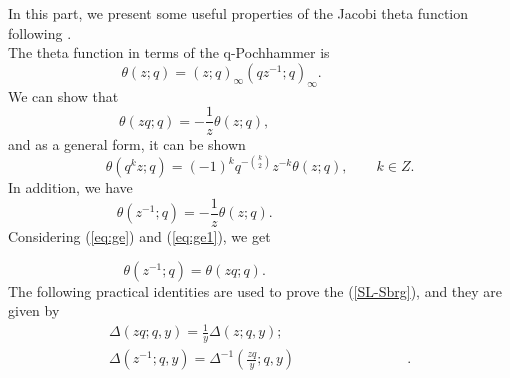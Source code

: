\documentclass[a4paper,11pt]{article}%
\numberwithin{equation}{section}
\begin{document}
In this part, we present some useful properties of the Jacobi theta function following \cite{Rosengren:2016qtr, Mod-Analyses}. \\
The theta function in terms of the q-Pochhammer is
\begin{equation}\label{theta;poch}
    \theta(z;q)=(z;q)_{\infty}(qz^{-1};q)_{\infty}.\qquad\qquad\,\,\,\,\,\,\,\,\,
\end{equation}
We can show that
\begin{equation}\label{eq:ge}
    \theta(zq;q)= -\frac{1}{z} \theta(z;q),\qquad\qquad\qquad\qquad\,\,\,\,\,\,\,\,
\end{equation}
and as a general form, it can be shown
\begin{equation}
    \theta(q^kz;q)=(-1)^k q^{-\binom{k}{2}}z^{-k}\theta(z;q), \qquad k\in Z.
\end{equation}
In addition, we have
\begin{equation} \label{eq:ge1}
    \theta(z^{-1};q)= -\frac{1}{z} \theta(z;q).\qquad\qquad\qquad\qquad\,\,\,\,\,\,\,\,
\end{equation}
Considering (\ref{eq:ge}) and (\ref{eq:ge1}), we get 

\begin{equation} \label{eq:ge2}
    \theta(z^{-1};q)=  \theta(zq;q).\qquad\qquad\qquad\qquad\,\,\,\,\,\,\,\,
\end{equation}
The following practical identities are used to prove the  (\ref{SL-Sbrg}), and they are given by
\begin{align}\label{pDelta}
    \Delta(zq;q,y)=\frac{1}{y}\Delta(z;q,y);\,\,\,\,\,\,\qquad\qquad\qquad\qquad\\ \nonumber
    \Delta(z^{-1};q,y)=\Delta^{-1}(\frac{zq}{y};q,y)\qquad\qquad\qquad\qquad.
\end{align}





\end{document}
